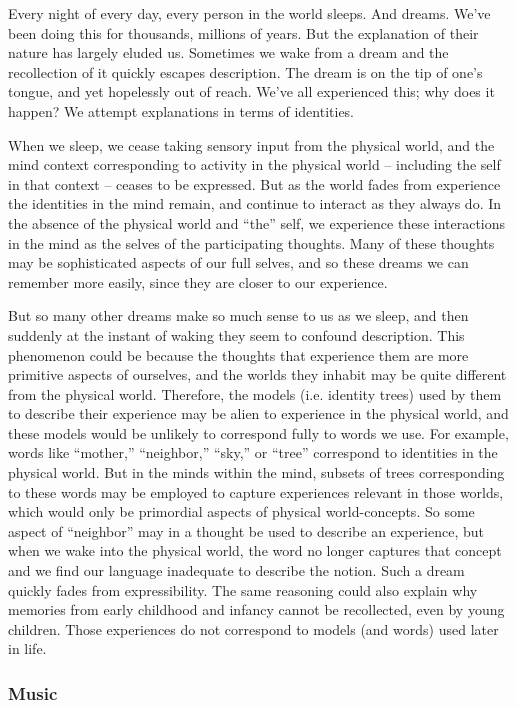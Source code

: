 \documentclass[pra,twocolumn,groupedaddress,10pt]{revtex4}
\theoremstyle{definition}
\begin{document}
Every night of every day, every person in the world sleeps. And dreams. We've been doing this for thousands, millions of years. But the explanation of their nature has largely eluded us. Sometimes we wake from a dream and the recollection of it quickly escapes description. The dream is on the tip of one's tongue, and yet hopelessly out of reach. We've all experienced this; why does it happen? We attempt explanations in terms of identities.

When we sleep, we cease taking sensory input from the physical world, and the mind context corresponding to activity in the physical world -- including the self in that context -- ceases to be expressed. But as the world fades from experience the identities in the mind remain, and continue to interact as they always do. In the absence of the physical world and ``the'' self, we experience these interactions in the mind as the selves of the participating thoughts. Many of these thoughts may be sophisticated aspects of our full selves, and so these dreams we can remember more easily, since they are closer to our experience.

But so many other dreams make so much sense to us as we sleep, and then suddenly at the instant of waking they seem to confound description. This phenomenon could be because the thoughts that experience them are more primitive aspects of ourselves, and the worlds they inhabit may be quite different from the physical world. Therefore, the models (i.e. identity trees) used by them to describe their experience may be alien to experience in the physical world, and these models would be unlikely to correspond fully to words we use. For example, words like ``mother,'' ``neighbor,'' ``sky,'' or ``tree'' correspond to identities in the physical world. But in the minds within the mind, subsets of trees corresponding to these words may be employed to capture experiences relevant in those worlds, which would only be primordial aspects of physical world-concepts. So some aspect of ``neighbor'' may in a thought be used to describe an experience, but when we wake into the physical world, the word no longer captures that concept and we find our language inadequate to describe the notion. Such a dream quickly fades from expressibility. The same reasoning could also explain why memories from early childhood and infancy cannot be recollected, even by young children. Those experiences do not correspond to models (and words) used later in life.

\subsubsection{Music} \label{sec:music}
\end{document}
